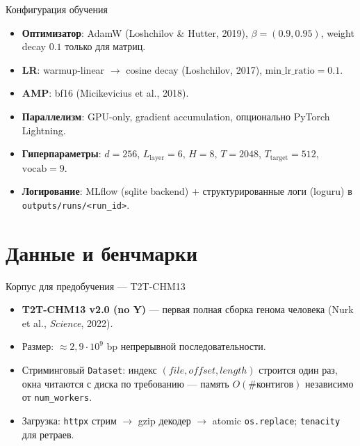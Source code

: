 \documentclass[aspectratio=169,xcolor=table]{beamer}
\begin{document}
\begin{frame}{Конфигурация обучения}
  \begin{itemize}
    \item \textbf{Оптимизатор}: AdamW (Loshchilov \& Hutter, 2019),
          $\beta = (0.9, 0.95)$, weight decay $0.1$ только для матриц.
    \item \textbf{LR}: warmup-linear $\to$ cosine decay (Loshchilov, 2017),
          $\text{min\_lr\_ratio} = 0.1$.
    \item \textbf{AMP}: bf16 (Micikevicius et al., 2018).
    \item \textbf{Параллелизм}: GPU-only, gradient accumulation, опционально
          PyTorch Lightning.
    \item \textbf{Гиперпараметры}: $d=256$, $L_{\text{layer}}=6$,
          $H=8$, $T=2048$, $T_{\text{target}}=512$, $\text{vocab}=9$.
    \item \textbf{Логирование}: MLflow (sqlite backend) + структурированные
          логи (loguru) в \texttt{outputs/runs/<run\_id>}.
  \end{itemize}
\end{frame}

\section{Данные и бенчмарки}

\begin{frame}{Корпус для предобучения --- T2T-CHM13}
  \begin{itemize}
    \item \textbf{T2T-CHM13 v2.0 (no Y)} --- первая полная сборка генома
          человека (Nurk et al., \emph{Science}, 2022).
    \item Размер: $\approx 2{,}9 \cdot 10^9$ bp непрерывной
          последовательности.
    \item Стриминговый \texttt{Dataset}: индекс $(file, offset, length)$
          строится один раз, окна читаются с диска по требованию ---
          память $O(\text{\# контигов})$ независимо от \texttt{num\_workers}.
    \item Загрузка: \texttt{httpx} стрим $\to$ gzip декодер $\to$ atomic
          \texttt{os.replace}; \texttt{tenacity} для ретраев.
  \end{itemize}
\end{frame}
\end{document}
